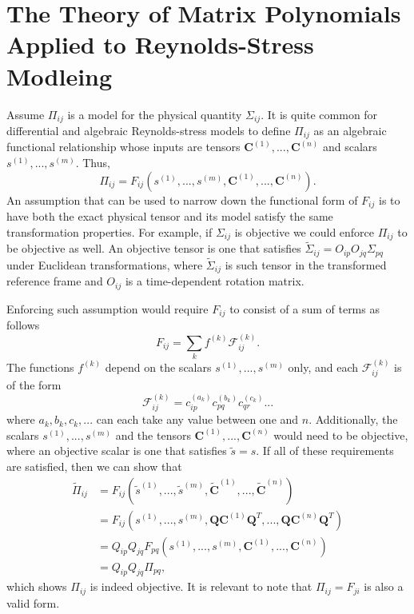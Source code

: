 \documentclass[oneside,a4paper,11pt]{report}
\begin{document}
\section{The Theory of Matrix Polynomials Applied to Reynolds-Stress Modleing}

\label{sec:polynomial_expansions}
Assume $\Pi_{ij}$ is a model for the physical quantity $\Sigma_{ij}$. It is quite common for differential and algebraic Reynolds-stress models to define $\Pi_{ij}$ as an algebraic functional relationship whose inputs are tensors $\mathbf{C}^{(1)},...,\mathbf{C}^{(n)}$ and scalars $s^{(1)},...,s^{(m)}$. Thus,
\begin{equation}
\Pi_{ij} = F_{ij}(s^{(1)}, ..., s^{(m)},\mathbf{C}^{(1)}, ..., \mathbf{C}^{(n)}).
\end{equation}
An assumption that can be used to narrow down the functional form of $F_{ij}$ is to have both the exact physical tensor and its model satisfy the same transformation properties. For example, if $\Sigma_{ij}$ is objective we could enforce $\Pi_{ij}$ to be objective as well. An objective tensor is one that satisfies $\tilde{\Sigma}_{ij} = O_{ip}O_{jq}\Sigma_{pq}$ under Euclidean transformations, where $\tilde{\Sigma}_{ij}$ is such tensor in the transformed reference frame and $O_{ij}$ is a time-dependent rotation matrix.

Enforcing such assumption would require $F_{ij}$ to consist of a sum of terms as follows
\begin{equation}
\label{poly_expan}
F_{ij} = \sum_{k} f^{(k)}\mathcal{F}_{ij}^{(k)}.
\end{equation}
The functions $f^{(k)}$ depend on the scalars $s^{(1)}, ...,s^{(m)}$ only, and each $\mathcal{F}_{ij}^{(k)}$ is of the form
\begin{equation}
\label{tensor_product}
\mathcal{F}_{ij}^{(k)} = c^{(a_k)}_{ip}c^{(b_k)}_{pq}c^{(c_k)}_{qr}...
\end{equation}
where $a_k,b_k,c_k,...$ can each take any value between one and $n$. Additionally, the scalars $s^{(1)},...,s^{(m)}$ and the tensors $\mathbf{C}^{(1)},...,\mathbf{C}^{(n)}$ would need to be objective, where an objective scalar is one that satisfies $\tilde{s} = s$. If all of these requirements are satisfied, then we can show that
\begin{align}
\tilde{\Pi}_{ij} & = F_{ij}(\tilde{s}^{(1)}, ..., \tilde{s}^{(m)},\tilde{\mathbf{C}}^{(1)}, ..., \tilde{\mathbf{C}}^{(n)}) \nonumber \\
& = F_{ij}(s^{(1)}, ..., s^{(m)},\mathbf{Q} \mathbf{C}^{(1)}\mathbf{Q}^T, ..., \mathbf{Q} \mathbf{C}^{(n)}\mathbf{Q}^T) \nonumber \\
& = Q_{ip}Q_{jq} F_{pq}(s^{(1)}, ..., s^{(m)}, \mathbf{C}^{(1)}, ..., \mathbf{C}^{(n)}) \nonumber \\
&= Q_{ip}Q_{jq} \Pi_{pq}, 
\end{align}
which shows $\Pi_{ij}$ is indeed objective. It is relevant to note that $\Pi_{ij} = F_{ji}$ is also a valid form.
\end{document}

